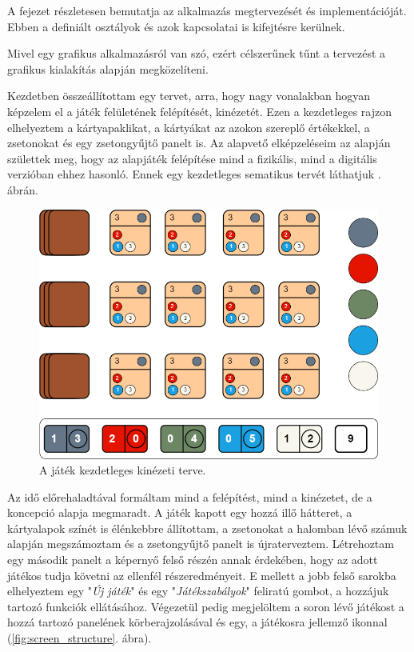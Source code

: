 
A fejezet részletesen bemutatja az alkalmazás megtervezését és implementációját.
Ebben a definiált osztályok és azok kapcsolatai is kifejtésre kerülnek.


Mivel egy grafikus alkalmazásról van szó, ezért célszerűnek tűnt a tervezést a grafikus kialakítás alapján megközelíteni.


Kezdetben összeállítottam egy tervet, arra, hogy nagy vonalakban hogyan képzelem el a játék felületének felépítését, kinézetét. Ezen a kezdetleges rajzon elhelyeztem a kártyapaklikat, a kártyákat az azokon szereplő értékekkel, a zsetonokat és egy zsetongyűjtő panelt is. Az alapvető elképzeléseim az alapján születtek meg, hogy az alapjáték felépítése mind a fizikális, mind a digitális verzióban ehhez hasonló. Ennek egy kezdetleges sematikus tervét láthatjuk . ábrán.

\begin{figure}[h]
\centering
\includegraphics[scale=0.37]{images/screen_structure_plan.png}
\caption{A játék kezdetleges kinézeti terve.}
\label{fig:screen_structure_plan}
\end{figure}


Az idő előrehaladtával formáltam mind a felépítést, mind a kinézetet, de a koncepció alapja megmaradt. A játék kapott egy hozzá illő hátteret, a kártyalapok színét is élénkebbre állítottam, a zsetonokat a halomban lévő számuk alapján megszámoztam és a zsetongyűjtő panelt is újraterveztem. Létrehoztam egy második panelt a képernyő felső részén annak érdekében, hogy az adott játékos tudja követni az ellenfél részeredményeit.
E mellett a jobb felső sarokba elhelyeztem egy "\textit{Új játék}" és egy "\textit{Játékszabályok}" feliratú gombot, a hozzájuk tartozó funkciók ellátásához. Végezetül pedig megjelöltem a soron lévő játékost a hozzá tartozó panelének körberajzolásával és egy, a játékosra jellemző ikonnal (\ref{fig:screen_structure}. ábra).

